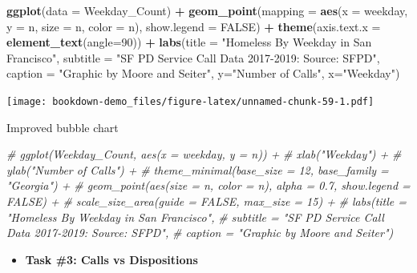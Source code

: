 \documentclass[]{book}
\newenvironment{Shaded}{\begin{snugshade}}{\end{snugshade}}
\newcommand{\CommentTok}[1]{\textcolor[rgb]{0.56,0.35,0.01}{\textit{#1}}}
\newcommand{\DataTypeTok}[1]{\textcolor[rgb]{0.13,0.29,0.53}{#1}}
\newcommand{\DecValTok}[1]{\textcolor[rgb]{0.00,0.00,0.81}{#1}}
\newcommand{\KeywordTok}[1]{\textcolor[rgb]{0.13,0.29,0.53}{\textbf{#1}}}
\newcommand{\NormalTok}[1]{#1}
\newcommand{\OperatorTok}[1]{\textcolor[rgb]{0.81,0.36,0.00}{\textbf{#1}}}
\newcommand{\OtherTok}[1]{\textcolor[rgb]{0.56,0.35,0.01}{#1}}
\newcommand{\StringTok}[1]{\textcolor[rgb]{0.31,0.60,0.02}{#1}}
\providecommand{\tightlist}{%
  \setlength{\itemsep}{0pt}\setlength{\parskip}{0pt}}
\begin{document}
\begin{Shaded}
\begin{Highlighting}[]
\KeywordTok{ggplot}\NormalTok{(}\DataTypeTok{data =}\NormalTok{ Weekday_Count) }\OperatorTok{+}\StringTok{ }
\StringTok{  }\KeywordTok{geom_point}\NormalTok{(}\DataTypeTok{mapping =} \KeywordTok{aes}\NormalTok{(}\DataTypeTok{x =}\NormalTok{ weekday, }\DataTypeTok{y =}\NormalTok{ n, }\DataTypeTok{size =}\NormalTok{ n, }\DataTypeTok{color =}\NormalTok{ n), }\DataTypeTok{show.legend =} \OtherTok{FALSE}\NormalTok{) }\OperatorTok{+}
\StringTok{  }\KeywordTok{theme}\NormalTok{(}\DataTypeTok{axis.text.x =} \KeywordTok{element_text}\NormalTok{(}\DataTypeTok{angle=}\DecValTok{90}\NormalTok{)) }\OperatorTok{+}
\StringTok{  }\KeywordTok{labs}\NormalTok{(}\DataTypeTok{title =} \StringTok{"Homeless By Weekday in San Francisco"}\NormalTok{, }
       \DataTypeTok{subtitle =} \StringTok{"SF PD Service Call Data 2017-2019: Source: SFPD"}\NormalTok{,}
       \DataTypeTok{caption =} \StringTok{"Graphic by Moore and Seiter"}\NormalTok{,}
       \DataTypeTok{y=}\StringTok{"Number of Calls"}\NormalTok{,}
       \DataTypeTok{x=}\StringTok{"Weekday"}\NormalTok{)}
\end{Highlighting}
\end{Shaded}

\texttt{[image: bookdown-demo\_files/figure-latex/unnamed-chunk-59-1.pdf]}

Improved bubble chart

\begin{Shaded}
\begin{Highlighting}[]
\CommentTok{# ggplot(Weekday_Count, aes(x = weekday, y = n)) +}
\CommentTok{#   xlab("Weekday") +}
\CommentTok{#   ylab("Number of Calls") +}
\CommentTok{#   theme_minimal(base_size = 12, base_family = "Georgia") +}
\CommentTok{#   geom_point(aes(size = n, color = n), alpha = 0.7, show.legend = FALSE) +}
\CommentTok{#   scale_size_area(guide = FALSE, max_size = 15) +}
\CommentTok{#   labs(title = "Homeless By Weekday in San Francisco", }
\CommentTok{#        subtitle = "SF PD Service Call Data 2017-2019: Source: SFPD",}
\CommentTok{#        caption = "Graphic by Moore and Seiter")}
\end{Highlighting}
\end{Shaded}

\begin{itemize}
\tightlist
\item
  \textbf{Task \#3: Calls vs Dispositions}
\end{itemize}
\end{document}
